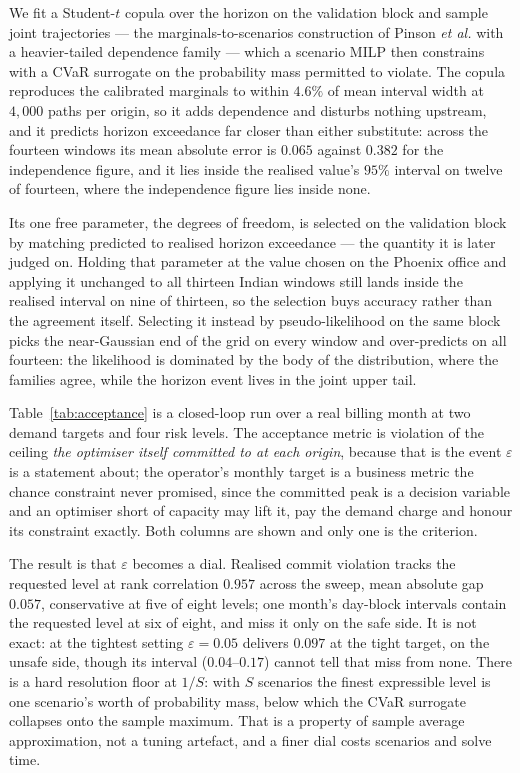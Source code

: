 \documentclass[conference]{IEEEtran}
\begin{document}


We fit a Student-$t$ copula over the horizon on the validation block and sample
joint trajectories --- the marginals-to-scenarios construction of Pinson
\emph{et al.}\cite{pinson2009scenarios} with a heavier-tailed dependence family
--- which a scenario MILP then constrains with a CVaR
surrogate\cite{rockafellar2000cvar,nemirovski2006convex} on the probability
mass permitted to violate. The copula reproduces the calibrated marginals to
within $4.6\%$ of mean interval width at $4{,}000$ paths per origin, so it adds
dependence and disturbs nothing upstream, and it predicts horizon exceedance
far closer than either substitute: across the fourteen windows its mean
absolute error is $0.065$ against $0.382$ for the independence figure, and it
lies inside the realised value's $95\%$ interval on twelve of fourteen, where
the independence figure lies inside none.

Its one free parameter, the degrees of freedom, is selected on the validation
block by matching predicted to realised horizon exceedance --- the quantity it
is later judged on. Holding that parameter at the value chosen on the Phoenix
office and applying it unchanged to all thirteen Indian windows still lands
inside the realised interval on nine of thirteen, so the selection buys
accuracy rather than the agreement itself. Selecting it instead by
pseudo-likelihood on the same block picks the near-Gaussian end of the grid on
every window and over-predicts on all fourteen: the likelihood is dominated by
the body of the distribution, where the families agree, while the horizon event
lives in the joint upper tail.

Table~\ref{tab:acceptance} is a closed-loop run over a real billing month at
two demand targets and four risk levels. The acceptance metric is violation of
the ceiling \emph{the optimiser itself committed to at each origin}, because
that is the event $\varepsilon$ is a statement about; the operator's monthly
target is a business metric the chance constraint never promised, since the
committed peak is a decision variable and an optimiser short of capacity may
lift it, pay the demand charge and honour its constraint exactly. Both columns
are shown and only one is the criterion.

The result is that $\varepsilon$ becomes a dial. Realised commit violation
tracks the requested level at rank correlation $0.957$ across the sweep, mean
absolute gap $0.057$, conservative at five of eight levels; one month's
day-block intervals contain the requested level at six of eight, and miss it
only on the safe side. It is not exact: at the tightest setting
$\varepsilon=0.05$ delivers $0.097$ at the tight target, on the unsafe side,
though its interval ($0.04$--$0.17$) cannot tell that miss from none. There is
a hard resolution floor at $1/S$: with $S$
scenarios the finest expressible level is one scenario's worth of probability
mass, below which the CVaR surrogate collapses onto the sample maximum. That is
a property of sample average approximation, not a tuning artefact, and a finer
dial costs scenarios and solve time.
\end{document}
